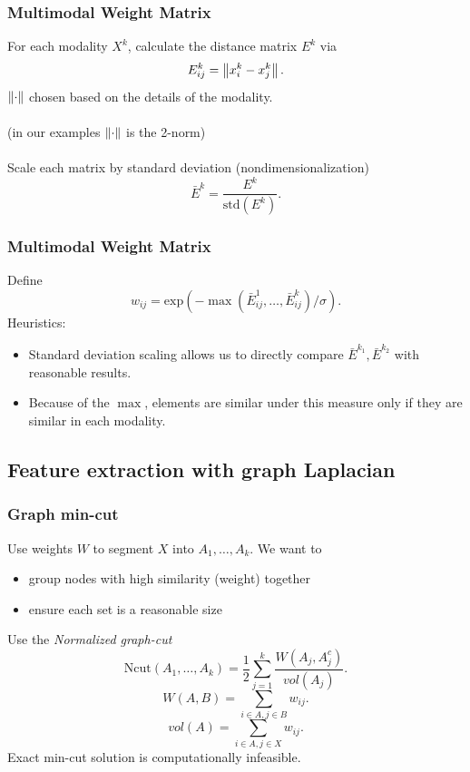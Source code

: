 \documentclass{beamer}
\begin{document}

\begin{frame}
  \frametitle{Multimodal Weight Matrix}
  For each modality $X^k$, calculate the distance matrix $E^k$ via
  \[E^k_{ij} = \left\lVert x^k_i - x^k_j\right\rVert.\]
  $\left\lVert\cdot\right\rVert$ chosen based on the details of the modality.\\~\\
  (in our examples $\left\lVert\cdot\right\rVert$ is the 2-norm) \\~\\
  Scale each matrix by standard deviation (nondimensionalization)
  \[\bar{E}^k = \frac{E^k}{\text{std}\left(E^k\right)}.\]
\end{frame}


\begin{frame}
  \frametitle{Multimodal Weight Matrix}
  Define \[w_{ij} = \text{exp}\left(-\max\left(\bar{E}^1_{ij},\ldots,\bar{E}^k_{ij}\right)/\sigma\right).\]
  Heuristics:
  \begin{itemize}
  \item Standard deviation scaling allows us to directly compare $\bar{E}^{k_1},\bar{E}^{k_2}$ with reasonable results.
  \item Because of the $\max$, elements are similar under this measure only if they are similar in each modality.
  \end{itemize}
\end{frame}
\subsection{Feature extraction with graph Laplacian}
\begin{frame}
  \frametitle{Graph min-cut}
  Use weights $W$ to segment $X$ into $A_1,\ldots,A_k$. We want to
  \begin{itemize}\item group nodes with high similarity (weight) together
  \item ensure each set is a reasonable size
  \end{itemize}
  Use the \emph{Normalized graph-cut}  
  \[\text{Ncut}(A_1,\ldots,A_k) = \frac{1}{2}\sum_{j=1}^k \frac{W(A_j,A_j^c)}{vol(A_j)}.\]
  \[W(A,B) = \sum_{i \in A, j \in B} w_{ij}.\]
  \[vol(A) = \sum_{i \in A, j \in X} w_{ij}.\]
  Exact min-cut solution is computationally infeasible.
\end{frame}
\end{document}
